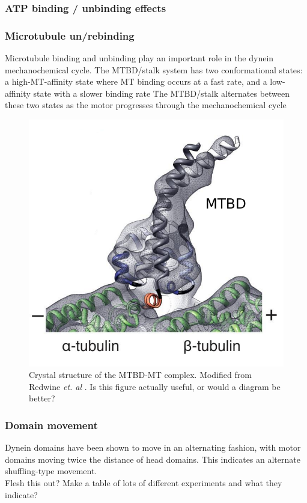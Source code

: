 \documentclass[10pt]{article} %
\begin{document}
\subsubsection{ATP binding / unbinding effects}
\subsubsection{Microtubule un/rebinding}
Microtubule binding and unbinding play an important role in the dynein mechanochemical cycle. The MTBD/stalk system has two conformational states: a high-MT-affinity state where MT binding occurs at a fast rate, and a low-affinity state with a slower binding rate \. The MTBD/stalk alternates between these two states as the motor progresses through the mechanochemical cycle


\begin{figure}[h]
  \centering
  \includegraphics[width=.65\textwidth,keepaspectratio]{../../figures/mtbd-complex.png}
  \caption{Crystal structure of the MTBD-MT complex. Modified from Redwine \textit{et. al} \cite{redwineMTBDcomplex}. Is this figure actually useful, or would a diagram be better?}
  \label{dynein-artist-rendition-2}
\end{figure}


\subsubsection{Domain movement}
Dynein domains have been shown to move in an alternating fashion, with motor domains moving twice the distance of head domains. This indicates an alternate shuffling-type movement.\\

Flesh this out? Make a table of lots of different experiments and what they indicate?\\
\end{document}
